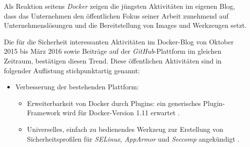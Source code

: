 \documentclass[../main.tex]{subfiles}
\begin{document}
  Als Reaktion seitens \emph{Docker} zeigen die jüngsten Aktivitäten im eigenen Blog, dass das Unternehmen den öffentlichen Fokus seiner Arbeit zunehmend auf Unternehmenslösungen und die Bereitstellung von Images und Werkzeugen setzt.

  Die für die Sicherheit interessanten Aktivitäten im Docker-Blog von Oktober 2015 bis März 2016 sowie Beiträge auf der \emph{GitHub}-Plattform im gleichen Zeitraum, bestätigen diesen Trend. Diese öffentlichen Aktivitäten sind in folgender Auflistung stichpunktartig genannt:

  \begin{itemize}
    \item Verbesserung der bestehenden Plattform:
      \begin{itemize}
        \item Erweiterbarkeit von Docker durch Plugins: ein generisches Plugin-Framework wird für Docker-Version 1.11 erwartet \cite{githubDockerRoadmap}\cite{githubAuthZPluginInfrastructure}.
        \item Universelles, einfach zu bedienendes Werkzeug zur Erstellung von Sicherheitsprofilen für \emph{SELinux}, \emph{AppArmor} und \emph{Seccomp} angekündigt \cite{githubGeneralSecProfiles}.
      \end{itemize}

\end{itemize}
\end{document}
